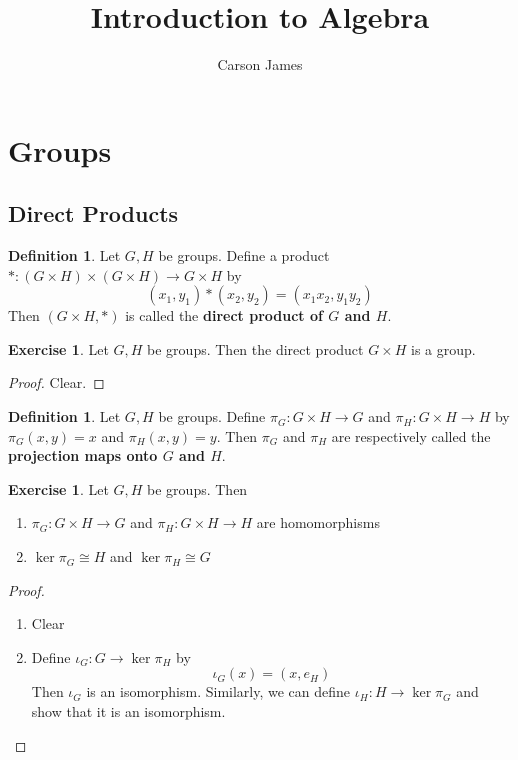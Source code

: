 \documentclass[12pt]{amsart}
\theoremstyle{definition}
\newtheorem{defn}[definition]{Definition}
\newtheorem{ex}[definition]{Exercise}
\newcommand{\lex}[1]{\label{ex:#1}}
\begin{document}
	
	\title{Introduction to Algebra}
	\author{Carson James}
	\maketitle
	
	\tableofcontents
	
	\newpage
	
	
	\section{Groups}
	
	\subsection{Direct Products}
	
	\begin{defn}
	Let $G,H$ be groups. Define a product $*:(G \times H) \times (G \times H) \rightarrow G \times H$ by 
	$$(x_1,y_1) * (x_2, y_2) = (x_1x_2, y_1y_2)$$
	Then $(G \times H, *)$ is called the \textbf{direct product of $G$ and $H$}.
	\end{defn}	
	
	\begin{ex}
	\lex{1} Let $G,H$ be groups. Then the direct product $G \times H$ is a group.
	\end{ex}
	\begin{proof}
	Clear.
	\end{proof}
	
	\begin{defn} 
	Let $G,H$ be groups. Define $\pi_G :G \times H \rightarrow G$ and $\pi_H :G \times H \rightarrow H$ by $\pi_G(x,y) = x$ and $\pi_H(x,y) = y$.  Then $\pi_G$ and $\pi_H$ are respectively called the \textbf{projection maps onto $G$ and $H$}.
	\end{defn}	
	
	\begin{ex}
	\lex{2} Let $G,H$ be groups. Then 
	\begin{enumerate}
	\item $\pi_G: G \times H \rightarrow G$ and $\pi_H : G \times H \rightarrow H$ are homomorphisms
	\item $\ker \pi_G \cong H$ and $\ker \pi_H \cong G$
\end{enumerate}	 
	\end{ex}
	
	\begin{proof}\
	\begin{enumerate}
	\item Clear
	\item Define $\iota_G:G \rightarrow \ker \pi_H$ by $$\iota_G(x) = (x, e_H)$$ Then $\iota_G$ is an isomorphism. Similarly, we can define $\iota_H:H \rightarrow \ker \pi_G$ and show that it is an isomorphism.
	\end{enumerate}
	\end{proof}
	
\end{document}
